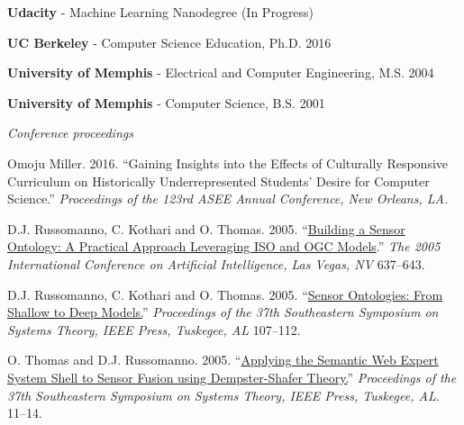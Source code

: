 \documentclass[11pt,article,oneside]{memoir}
\begin{document}
\bigskip 



\ind \textbf{Udacity} - Machine Learning Nanodegree  \hfill (In Progress)

\ind \textbf{UC Berkeley} - Computer Science Education, Ph.D. \hfill 2016

\ind \textbf{University of Memphis} - Electrical and Computer Engineering, M.S. \hfill 2004

\ind \textbf{University of Memphis} - Computer Science, B.S. \hfill 2001

\bigskip 


\medskip

\noindent\emph{Conference proceedings \vspace{0.05in}}
 

\ind Omoju Miller. 2016. ``Gaining Insights into the Effects of Culturally Responsive Curriculum on Historically Underrepresented Students' Desire for Computer Science.'' \emph{Proceedings of the 123rd ASEE Annual Conference, New Orleans, LA.}

\ind D.J. Russomanno, C. Kothari and O. Thomas. 2005. ``\href{https://scholar.google.com/citations?view_op=view_citation&hl=en&user=E7z_wrwAAAAJ&sortby=pubdate&citation_for_view=E7z_wrwAAAAJ:u5HHmVD_uO8C}{Building a Sensor Ontology: A Practical Approach Leveraging ISO and OGC Models}.'' \emph{The 2005 International Conference on Artificial Intelligence, Las Vegas, NV} 637--643. 

\ind D.J. Russomanno, C. Kothari and O. Thomas. 2005. ``\href{http://scholar.google.com/citations?view_op=view_citation&hl=en&user=E7z_wrwAAAAJ&citation_for_view=E7z_wrwAAAAJ:u-x6o8ySG0sC}{Sensor Ontologies: From Shallow to Deep Models.}'' \emph{Proceedings of the 37th Southeastern Symposium on Systems Theory, IEEE Press, Tuskegee, AL} 107--112. 

\ind O. Thomas and D.J. Russomanno. 2005. ``\href{http://scholar.google.com/citations?view_op=view_citation&hl=en&user=E7z_wrwAAAAJ&citation_for_view=E7z_wrwAAAAJ:d1gkVwhDpl0C}{Applying the Semantic Web Expert System Shell to Sensor Fusion using Dempster-Shafer Theory.}'' \emph{Proceedings of the 37th Southeastern Symposium on Systems Theory, IEEE Press, Tuskegee, AL}. 11--14.
\end{document}

